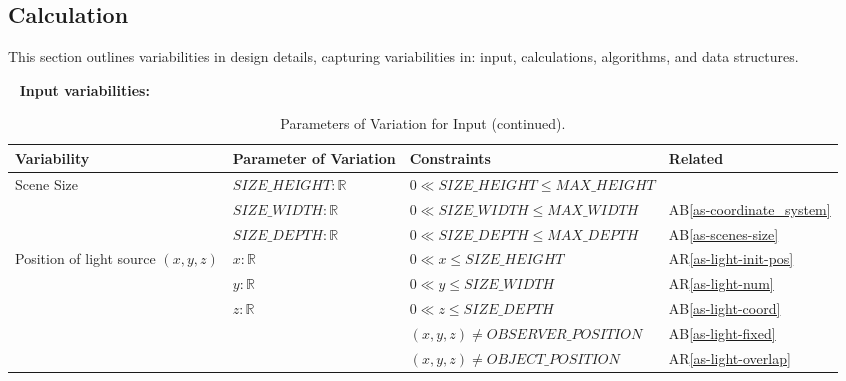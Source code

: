 \documentclass[12pt]{article}
\newcommand{\aBref}[1]{AB\ref{#1}}
\newcommand{\aRref}[1]{AR\ref{#1}}
\begin{document}
%
%

\subsection{Calculation} \label{sec_Calculation}
This section outlines variabilities in design details, capturing variabilities 
in: input, calculations, algorithms, and data structures.

~\newline
\textbf{Input variabilities:} 
\begin{table}[H]
	\centering
	\begin{tabular}{|p{6cm}|p{5cm}|p{4cm}|p{2cm}|}
		\hline
		\textbf{Variability} & \textbf{Parameter of Variation} & 
		\textbf{Constraints} &  \textbf{Related} \\
		\hline
		\multirow{3}{*}{Scene Size} & $SIZE\_HEIGHT: \mathbb{R}$ & $0 \ll 
		SIZE\_HEIGHT \le MAX\_HEIGHT$ & 
		\\
		& $SIZE\_WIDTH: \mathbb{R}$ & $0 \ll 
		SIZE\_WIDTH \le MAX\_WIDTH$ & \aBref{as-coordinate_system}\\
		& $SIZE\_DEPTH: \mathbb{R}$ & $0 \ll 
		SIZE\_DEPTH \le MAX\_DEPTH$ & \aBref{as-scenes-size} \\
		\hline
		\multirow{5}{*}{Position of light source $(x,y,z)$} & $x: \mathbb{R}$ & 
		$0 \ll x \le SIZE\_HEIGHT$	& \aRref{as-light-init-pos}\\
		& $y: \mathbb{R}$ &  $0 \ll y \le SIZE\_WIDTH$ & 
		\aRref{as-light-num}\\
		& $z: \mathbb{R}$ &  $0 \ll z \le SIZE\_DEPTH$ & \aBref{as-light-coord} 
		\\
		& & $(x,y,z) \ne OBSERVER\_POSITION $ & 
		\aBref{as-light-fixed}\\
		& &  $(x,y,z) \ne OBJECT\_POSITION $& \aRref{as-light-overlap}\\
		\hline		
	\end{tabular}
	\caption{Parameters of Variation for Input (continued).}
	\label{tbl:Input_Variations}
\end{table}
\end{document}

